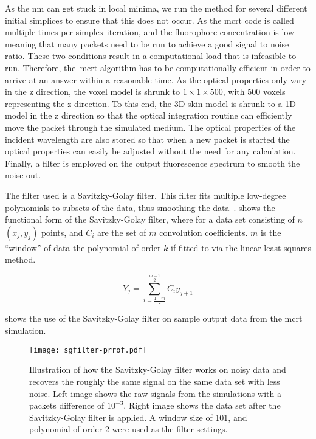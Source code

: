 As the \gls*{nm} can get stuck in local minima, we run the method for several different initial simplices to ensure that this does not occur.
As the \gls*{mcrt} code is called multiple times per simplex iteration, and the fluorophore concentration is low meaning that many packets need to be run to achieve a good signal to noise ratio.
These two conditions result in a computational load that is infeasible to run. 
Therefore, the~\gls*{mcrt} algorithm has to be computationally efficient in order to arrive at an answer within a reasonable time.
As the optical properties only vary in the z direction, the voxel model is shrunk to $1 \times 1 \times 500$, with 500 voxels representing the z direction.
To this end, the 3D skin model is shrunk to a 1D model in the z direction so that the optical integration routine can efficiently move the packet through the simulated medium.
The optical properties of the incident wavelength are also stored so that when a new packet is started the optical properties can easily be adjusted without the need for any calculation.
Finally, a filter is employed on the output fluorescence spectrum to smooth the noise out.

The filter used is a Savitzky-Golay filter.
This filter fits multiple low-degree polynomials to subsets of the data, thus smoothing the data~\cite{press1990savitzky}. 
 shows the functional form of the Savitzky-Golay filter, where for a data set consisting of $n$ $(x_j,y_j)$ points, and $C_i$ are the set of $m$ convolution coefficients.
$m$ is the ``window'' of data the polynomial of order $k$ if fitted to via the linear least squares method.

\begin{equation}
Y_j=\sum\limits_{i=\tfrac{1-m}{2}}^{\tfrac{m-1}{2}}C_i y_{j+1}\label{eqn:svgfiltereqn}
\end{equation}

 shows the use of the Savitzky-Golay filter on sample output data from the \gls*{mcrt} simulation.

\begin{figure}[!htbp]
  \centering
  \texttt{[image: sgfilter-prrof.pdf]}
  \caption{Illustration of how the Savitzky-Golay filter works on noisy data and recovers the roughly the same signal on the same data set with less noise. Left image shows the raw signals from the simulations with a packets difference of $10^{-3}$. Right image shows the data set after the Savitzky-Golay filter is applied. A window size of 101, and polynomial of order 2 were used as the filter settings.}
  \label{fig:sgfilter}
\end{figure}


